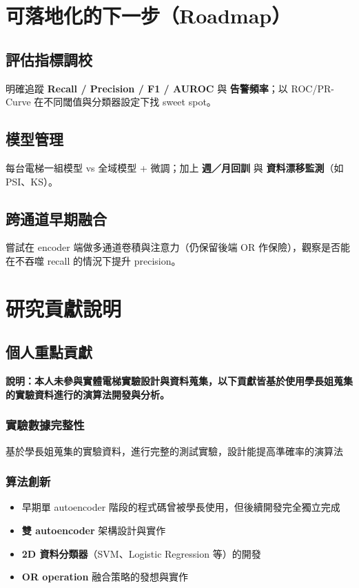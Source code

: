 \documentclass[12pt,a4paper]{article}
\begin{document}
\section{可落地化的下一步（Roadmap）}

\subsection{評估指標調校}

明確追蹤 \textbf{Recall / Precision / F1 / AUROC} 與 \textbf{告警頻率}；以 ROC/PR-Curve 在不同閾值與分類器設定下找 sweet spot。

\subsection{模型管理}

每台電梯一組模型 vs 全域模型 + 微調；加上 \textbf{週／月回訓} 與 \textbf{資料漂移監測}（如 PSI、KS）。

\subsection{跨通道早期融合}

嘗試在 encoder 端做多通道卷積與注意力（仍保留後端 OR 作保險），觀察是否能在不吞噬 recall 的情況下提升 precision。

\section{研究貢獻說明}

\subsection{個人重點貢獻}

\textbf{說明：本人未參與實體電梯實驗設計與資料蒐集，以下貢獻皆基於使用學長姐蒐集的實驗資料進行的演算法開發與分析。}

\subsubsection{實驗數據完整性}
基於學長姐蒐集的實驗資料，進行完整的測試實驗，設計能提高準確率的演算法

\subsubsection{算法創新}
\begin{itemize}
    \item 早期單 autoencoder 階段的程式碼曾被學長使用，但後續開發完全獨立完成
    \item \textbf{雙 autoencoder} 架構設計與實作
    \item \textbf{2D 資料分類器}（SVM、Logistic Regression 等）的開發
    \item \textbf{OR operation} 融合策略的發想與實作
\end{itemize}
\end{document}
